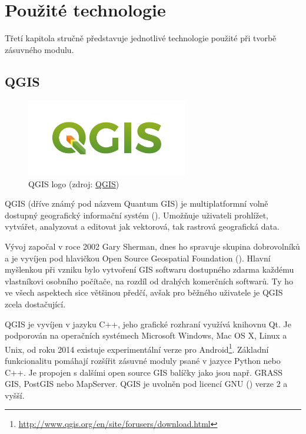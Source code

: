 \chapter{Použité technologie}
\label{3-technologie}

Třetí kapitola stručně představuje jednotlivé technologie použité při
tvorbě zásuvného modulu.

\section{QGIS}

\begin{figure}[H] \centering
      \includegraphics[width=200pt]{./pictures/qgis-logo.png}
      \caption[QGIS logo]{QGIS logo (zdroj:
\href{https://www.qgis.org/en/_downloads/qgis-logo.png}{QGIS})}
      \label{fig:qgis}
  \end{figure}

QGIS (dříve známý pod názvem Quantum GIS) je multiplatformní volně
dostupný geografický informační systém (). Umožňuje uživateli
prohlížet, vytvářet, analyzovat a editovat jak vektorová, tak rastrová
geografická data.

Vývoj započal v roce 2002 Gary Sherman, dnes ho spravuje skupina
dobrovolníků a je vyvíjen pod hlavičkou Open Source Geospatial
Foundation (). Hlavní myšlenkou při vzniku bylo vytvoření
GIS softwaru dostupného zdarma každému vlastníkovi osobního počítače,
na rozdíl od drahých komerčních softwarů. Ty ho ve všech aspektech
sice většinou předčí, avšak pro běžného uživatele je QGIS zcela
dostačující.

QGIS je vyvíjen v jazyku C++, jeho grafické rozhraní využívá knihovnu
Qt. Je podporován na operačních systémech Microsoft Windows, Mac OS X,
Linux a Unix, od roku 2014 existuje experimentální verze pro
Android\footnote{\url{http://www.qgis.org/en/site/forusers/download.html}}. Základní
funkcionalitu pomáhají rozšířit zásuvné moduly psané v jazyce Python
nebo C++. Je propojen s dalšími open source GIS balíčky jako jsou
např. GRASS GIS, PostGIS nebo MapServer. QGIS je uvolněn pod licencí
GNU () verze 2 a vyšší. \cite{qgis}

